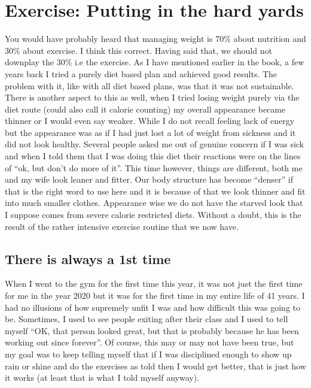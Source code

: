 \documentclass[
  oneside]{book}
\begin{document}
\hypertarget{exercise-putting-in-the-hard-yards}{%
\chapter{Exercise: Putting in the hard yards}\label{exercise-putting-in-the-hard-yards}}

You would have probably heard that managing weight is 70\% about nutrition and 30\% about exercise. I think this correct. Having said that, we should not downplay the 30\% i.e the exercise. As I have mentioned earlier in the book, a few years back I tried a purely diet based plan and achieved good results. The problem with it, like with all diet based plans, was that it was not sustainable. There is another aspect to this as well, when I tried losing weight purely via the diet route (could also call it calorie counting) my overall appearance became thinner or I would even say weaker. While I do not recall feeling lack of energy but the appearance was as if I had just lost a lot of weight from sickness and it did not look healthy. Several people asked me out of genuine concern if I was sick and when I told them that I was doing this diet their reactions were on the lines of ``ok, but don't do more of it''. This time however, things are different, both me and my wife look leaner and fitter. Our body structure has become ``denser'' if that is the right word to use here and it is because of that we look thinner and fit into much smaller clothes. Appearance wise we do not have the starved look that I suppose comes from severe calorie restricted diets. Without a doubt, this is the result of the rather intensive exercise routine that we now have.

\hypertarget{there-is-always-a-1st-time}{%
\section{There is always a 1st time}\label{there-is-always-a-1st-time}}

When I went to the gym for the first time this year, it was not just the first time for me in the year 2020 but it was for the first time in my entire life of 41 years. I had no illusions of how supremely unfit I was and how difficult this was going to be. Sometimes, I used to see people exiting after their class and I used to tell myself ``OK, that person looked great, but that is probably because he has been working out since forever''. Of course, this may or may not have been true, but my goal was to keep telling myself that if I was disciplined enough to show up rain or shine and do the exercises as told then I would get better, that is just how it works (at least that is what I told myself anyway).
\end{document}
